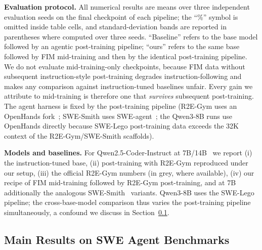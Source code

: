 \textbf{Evaluation protocol.}
All numerical results are means over three independent evaluation seeds
on the final checkpoint of each pipeline; the ``\%'' symbol is omitted
inside table cells, and standard-deviation bands are reported in
parentheses where computed over three seeds. ``Baseline'' refers to the
base model followed by an agentic
post-training pipeline; ``ours'' refers to the same base followed by FIM
mid-training and then by the identical post-training pipeline. We do not
evaluate mid-training-only checkpoints, because FIM data without
subsequent instruction-style post-training degrades instruction-following
and makes any comparison against instruction-tuned baselines unfair.
Every gain we attribute to mid-training is therefore one that
\emph{survives} subsequent post-training. The agent harness is fixed by
the post-training pipeline (R2E-Gym uses an OpenHands fork~\citep{openhands,
r2egym}; SWE-Smith uses SWE-agent~\citep{sweagent}; the Qwen3-8B runs use
OpenHands directly because SWE-Lego post-training data exceeds the 32K
context of the R2E-Gym/SWE-Smith scaffolds).

\textbf{Models and baselines.}
For Qwen2.5-Coder-Instruct at 7B/14B~\citep{qwencoder} we report
(i) the instruction-tuned base, (ii) post-training with R2E-Gym
reproduced under our setup, (iii) the official R2E-Gym numbers (in grey,
where available), (iv) our recipe of FIM mid-training followed by
R2E-Gym post-training, and at 7B additionally the analogous
SWE-Smith~\citep{swesmith} variants. Qwen3-8B uses the
SWE-Lego~\citep{swelego} pipeline; the cross-base-model comparison thus
varies the post-training pipeline simultaneously, a confound we discuss
in Section~\ref{sec:exp:main}.

\vspace{-0.5ex}
\subsection{Main Results on SWE Agent Benchmarks}
\label{sec:exp:main}


